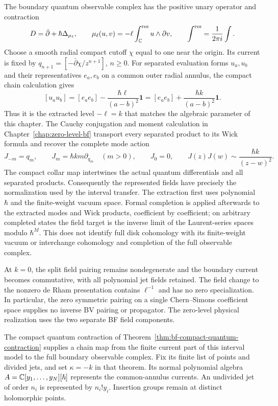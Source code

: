 The boundary quantum observable complex has the positive unary
operator and contraction
\[
 D=\bar\partial+\hbar\Delta_{\mu_\ell},\qquad
 \mu_\ell(u,v)=-\ell\int_\mathbb C^{\mathrm{res}}u\wedge\partial v,
 \qquad \int^{\mathrm{res}}=\frac1{2\pi i}\int.
\]
Choose a smooth radial compact cutoff $\chi$ equal to one near the
origin.  Its current is fixed by
$q_{n+1}=[-\bar\partial\chi/z^{n+1}]$, $n\ge0$.
For separated evaluation forms $u_a,u_b$ and their representatives
$e_a,e_b$ on a common outer radial annulus, the compact chain
calculation gives
\[
 [u_au_b]=[e_ae_b]-\frac{\hbar\ell}{(a-b)^2}\mathbf1
                  =[e_ae_b]+\frac{\hbar k}{(a-b)^2}\mathbf1.
\]
Thus it is the extracted level $-\ell=k$ that matches the algebraic
parameter of this chapter.  The Cauchy conjugation and moment
calculation in Chapter~\ref{chap:zero-level-bf} transport every
separated product to its Wick formula and recover the complete mode action
\[
 J_{-m}=q_m,\qquad J_m=\hbar k m\partial_{q_m}\quad(m>0),\qquad J_0=0,
 \qquad J(z)J(w)\sim\frac{\hbar k}{(z-w)^2}.
\]
The compact collar map intertwines the actual quantum differentials
and all separated products.  Consequently the represented fields
have precisely the normalization used by the interval transfer.
The extraction first uses polynomial $\hbar$ and the finite-weight
vacuum space.  Formal completion is applied afterwards to the
extracted modes and Wick products, coefficient by coefficient; on
arbitrary completed states the field target is the inverse limit
of the Laurent-series spaces modulo $\hbar^M$.  This does not identify
full disk cohomology with its finite-weight vacuum or interchange
cohomology and completion of the full observable complex.

At $k=0$, the split field pairing remains nondegenerate and the
boundary current becomes commutative, with all polynomial jet fields
retained.  The field change to the nonzero de Rham presentation
contains $\ell^{-1}$ and has no zero specialization.  In particular,
the zero symmetric pairing on a single Chern--Simons coefficient
space supplies no inverse BV pairing or propagator.  The zero-level
physical realization uses the two separate BF field components.

The compact quantum contraction of
Theorem~\ref{thm:bf-compact-quantum-contraction} supplies a chain map
from the finite current part of this interval model to the full
boundary observable complex.  Fix its finite list of points and divided
jets, and set $\kappa=-k$ in that theorem.  Its normal polynomial algebra
$A=\mathbb C[y_1,\ldots,y_N][\hbar]$ represents the common-annulus currents.
An undivided jet of order $n_i$ is represented by $n_i!y_i$.
Insertion groups remain at distinct holomorphic points.

